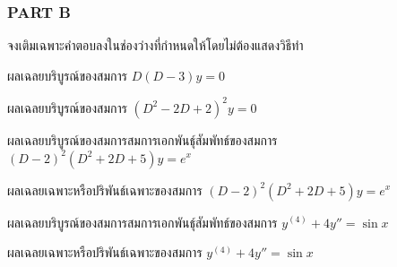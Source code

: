 \documentclass[12pt,final]{novelette} %
\begin{document}
\subsubsection*{PART B}

\begin{question}[resume]
    \item {}
    จงเติมเฉพาะคำตอบลงในช่องว่างที่กำหนดให้โดยไม่ต้องแสดงวิธีทำ 
    \begin{question}
        \item
        ผลเฉลยบริบูรณ์ของสมการ $D(D-3)y = 0$ 



        \item
        ผลเฉลยบริบูรณ์ของสมการ $(D^2 - 2D + 2)^2 y = 0$ 



        \item
        ผลเฉลยบริบูรณ์ของสมการสมการเอกพันธ์ุสัมพัทธ์ของสมการ $(D-2)^2(D^2+2D+5)y = e^x$ 



        \item
        ผลเฉลยเฉพาะหรือปริพันธ์เฉพาะของสมการ $(D-2)^2(D^2+2D+5)y = e^x$ 



        \item
        ผลเฉลยบริบูรณ์ของสมการสมการเอกพันธ์ุสัมพัทธ์ของสมการ $y^{(4)} + 4y'' = \sin x$ 



        \item
        ผลเฉลยเฉพาะหรือปริพันธ์เฉพาะของสมการ $y^{(4)} + 4y'' = \sin x$ 




\end{question}
\end{question}
\end{document}
